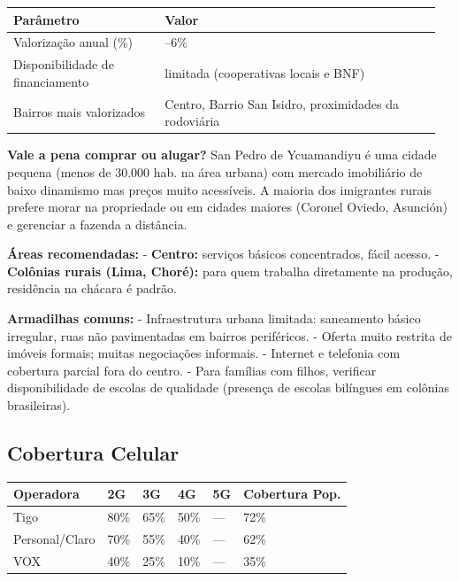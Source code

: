 {\small
\setlength{\tabcolsep}{3pt}
\renewcommand{\arraystretch}{1.12}
\begin{tabularx}{\linewidth}{>{\raggedright\arraybackslash}p{0.34\linewidth} >{\raggedright\arraybackslash}p{0.62\linewidth}}
\toprule
Parâmetro & Valor \\
\midrule
Valorização anual (\%) & 4--6\% \\
Disponibilidade de financiamento & limitada (cooperativas locais e BNF) \\
Bairros mais valorizados & Centro, Barrio San Isidro, proximidades da rodoviária \\
\bottomrule
\end{tabularx}
}


\textbf{Vale a pena comprar ou alugar?}
San Pedro de Ycuamandiyu é uma cidade pequena (menos de 30.000 hab. na área urbana) com mercado imobiliário de baixo dinamismo mas preços muito acessíveis. A maioria dos imigrantes rurais prefere morar na propriedade ou em cidades maiores (Coronel Oviedo, Asunción) e gerenciar a fazenda a distância.

\textbf{Áreas recomendadas:}
- \textbf{Centro:} serviços básicos concentrados, fácil acesso.
- \textbf{Colônias rurais (Lima, Choré):} para quem trabalha diretamente na produção, residência na chácara é padrão.

\textbf{Armadilhas comuns:}
- Infraestrutura urbana limitada: saneamento básico irregular, ruas não pavimentadas em bairros periféricos.
- Oferta muito restrita de imóveis formais; muitas negociações informais.
- Internet e telefonia com cobertura parcial fora do centro.
- Para famílias com filhos, verificar disponibilidade de escolas de qualidade (presença de escolas bilíngues em colônias brasileiras).




\subsection{Cobertura Celular}



{\small
\setlength{\tabcolsep}{3pt}
\renewcommand{\arraystretch}{1.12}
{\small
\begin{tabularx}{\linewidth}{lXXXXX}
\toprule
Operadora & 2G & 3G & 4G & 5G & Cobertura Pop. \\
\midrule
Tigo & 80\% & 65\% & 50\% & --- & 72\% \\
Personal/Claro & 70\% & 55\% & 40\% & --- & 62\% \\
VOX & 40\% & 25\% & 10\% & --- & 35\% \\
\bottomrule
\end{tabularx}
}
}

